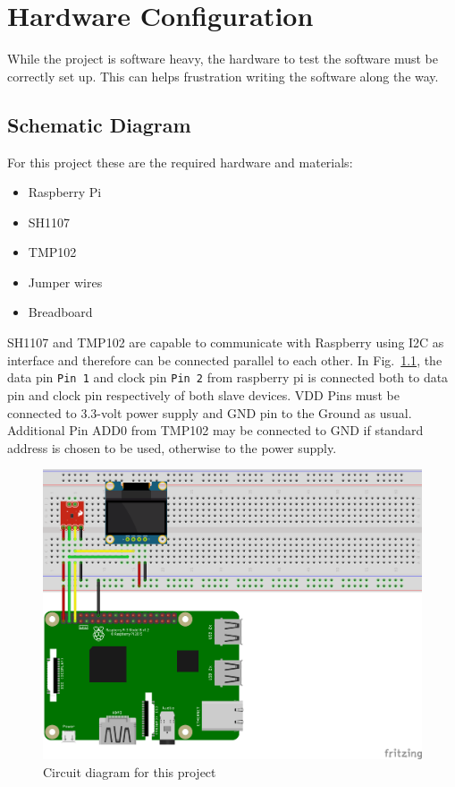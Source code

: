 \chapter{Hardware Configuration}
While the project is software heavy, the hardware to test the software must be correctly set up. This can helps frustration writing the software along the way.

\section{Schematic Diagram}
For this project these are the required hardware and materials:
\begin{itemize}
	\item Raspberry Pi
	\item SH1107
	\item TMP102
	\item Jumper wires
	\item Breadboard
\end{itemize}
SH1107 and  TMP102 are capable to communicate with Raspberry using I2C as interface and therefore can be connected parallel to each other. In Fig.~\ref{fig:fig1}, the data pin \verb'Pin 1' and clock pin \verb'Pin 2' from raspberry pi is connected both to data pin and clock pin respectively of both slave devices. VDD Pins must be connected to 3.3-volt power supply and GND pin to the Ground as usual. Additional Pin ADD0 from TMP102 may be connected to GND if standard address is chosen to be used, otherwise to the power supply.

\begin{figure}
	\centering
	\includegraphics[width=.8\linewidth]{circuit-diagram.png}
	\caption{Circuit diagram for this project}\label{fig:fig1}
\end{figure}

